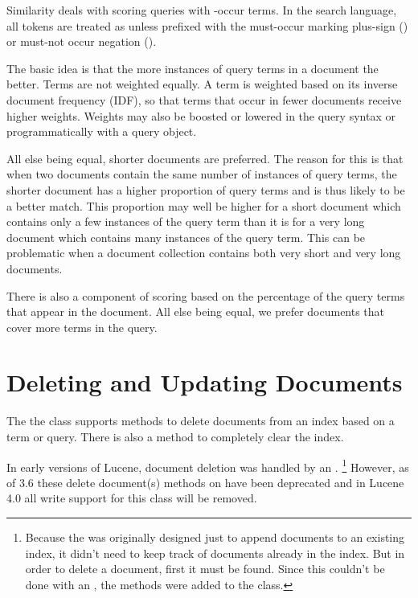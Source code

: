 Similarity deals with scoring queries with -occur terms.
In the search language, all tokens are treated as 
unless prefixed with the must-occur marking plus-sign
(\code{+}) or must-not occur negation (\code{-}).

The basic idea is that the more instances of query terms in a document
the better.  Terms are not weighted equally.  A term is weighted based
on its inverse document frequency (IDF), so that terms that occur in
fewer documents receive higher weights.  Weights may also be boosted
or lowered in the query syntax or programmatically with a query object.

All else being equal, shorter documents are preferred.
The reason for this is that when two documents contain the same number of
instances of query terms, the shorter document has a higher proportion of query
terms and is thus likely to be a better match.
This proportion may well be higher for a short document which contains only
a few instances of the query term than it is for a very long document which
contains many instances of the query term.
This can be problematic when a document collection contains both
very short and very long documents.

There is also a component of scoring based on the percentage of the
query terms that appear in the document.  All else being equal, we
prefer documents that cover more terms in the query.


\section{Deleting and Updating Documents}\label{section:lucene-delete}

The the  class supports methods to delete documents
from an index based on a term or query.
There is also a  method to completely clear the index.

In early versions of Lucene, document deletion was handled by
an .%
%
\footnote{Because the  was originally designed just
  to append documents to an existing index, it didn't need to keep
  track of documents already in the index.  But in order to delete a
  document, first it must be found.  Since this couldn't be done
  with an , the  methods were
  added to the  class.}
%
However, as of 3.6 these delete document(s) methods on  have
been deprecated and in Lucene 4.0 all write support for this class will be removed.

